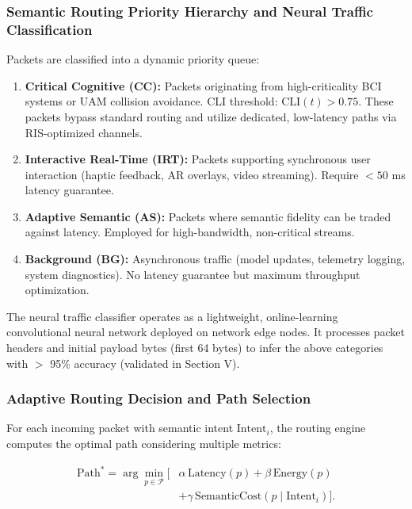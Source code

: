 \documentclass{BVP_CINC}
\begin{document}
\subsubsection{Semantic Routing Priority Hierarchy and Neural Traffic Classification}
Packets are classified into a dynamic priority queue:

\begin{enumerate}
    \item \textbf{Critical Cognitive (CC):} Packets originating from high-criticality BCI systems or UAM collision avoidance. CLI threshold: $\text{CLI}(t) > 0.75$. These packets bypass standard routing and utilize dedicated, low-latency paths via RIS-optimized channels.
    \item \textbf{Interactive Real-Time (IRT):} Packets supporting synchronous user interaction (haptic feedback, AR overlays, video streaming). Require $<50$ ms latency guarantee.
    \item \textbf{Adaptive Semantic (AS):} Packets where semantic fidelity can be traded against latency. Employed for high-bandwidth, non-critical streams.
    \item \textbf{Background (BG):} Asynchronous traffic (model updates, telemetry logging, system diagnostics). No latency guarantee but maximum throughput optimization.
\end{enumerate}

The neural traffic classifier operates as a lightweight, online-learning convolutional neural network deployed on network edge nodes. It processes packet headers and initial payload bytes (first 64 bytes) to infer the above categories with $>$ 95\% accuracy (validated in Section V).

\subsubsection{Adaptive Routing Decision and Path Selection}
For each incoming packet with semantic intent $\text{Intent}_i$, the routing engine computes the optimal path considering multiple metrics:

\begin{equation}
\begin{aligned}
\text{Path}^* = \arg\min_{p \in \mathcal{P}}\big[&\alpha\,\text{Latency}(p)+\beta\,\text{Energy}(p)\\
&+\gamma\,\text{SemanticCost}(p\mid\text{Intent}_i)\big].
\end{aligned}
\end{equation}
\end{document}
